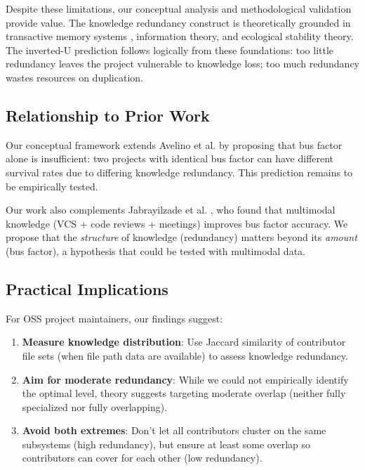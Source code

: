 \documentclass[11pt,letterpaper]{article}
\begin{document}
Despite these limitations, our conceptual analysis and methodological validation provide value. The knowledge redundancy construct is theoretically grounded in transactive memory systems \cite{Ren2011, Wegner1985}, information theory, and ecological stability theory. The inverted-U prediction follows logically from these foundations: too little redundancy leaves the project vulnerable to knowledge loss; too much redundancy wastes resources on duplication.

\subsection{Relationship to Prior Work}

Our conceptual framework extends Avelino et al. \cite{Avelino2019} by proposing that bus factor alone is insufficient: two projects with identical bus factor can have different survival rates due to differing knowledge redundancy. This prediction remains to be empirically tested.

Our work also complements Jabrayilzade et al. \cite{Jabrayilzade2022}, who found that multimodal knowledge (VCS + code reviews + meetings) improves bus factor accuracy. We propose that the \textit{structure} of knowledge (redundancy) matters beyond its \textit{amount} (bus factor), a hypothesis that could be tested with multimodal data.

\subsection{Practical Implications}

For OSS project maintainers, our findings suggest:

\begin{enumerate}
    \item \textbf{Measure knowledge distribution}: Use Jaccard similarity of contributor file sets (when file path data are available) to assess knowledge redundancy.
    
    \item \textbf{Aim for moderate redundancy}: While we could not empirically identify the optimal level, theory suggests targeting moderate overlap (neither fully specialized nor fully overlapping).
    
    \item \textbf{Avoid both extremes}: Don't let all contributors cluster on the same subsystems (high redundancy), but ensure at least some overlap so contributors can cover for each other (low redundancy).
\end{enumerate}
\end{document}
